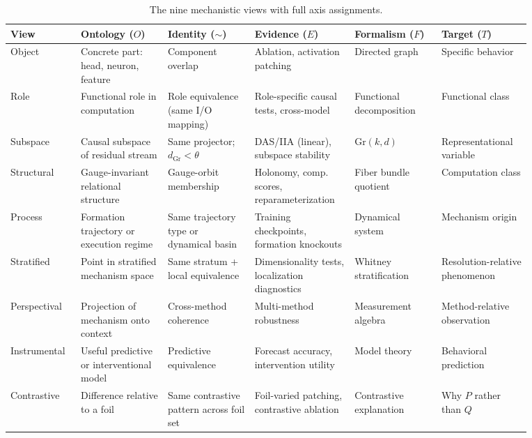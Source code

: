 \documentclass{article}
\newcommand{\Gr}{\mathrm{Gr}}
\begin{document}
\begin{table}[H]
\centering
\small
\setlength{\tabcolsep}{4pt}
\begin{tabular}{p{0.10\linewidth}p{0.15\linewidth}p{0.15\linewidth}p{0.17\linewidth}p{0.15\linewidth}p{0.15\linewidth}}
\toprule
\textbf{View} & \textbf{Ontology ($O$)} & \textbf{Identity ($\sim$)}
  & \textbf{Evidence ($E$)} & \textbf{Formalism ($F$)} & \textbf{Target ($T$)} \\
\midrule
Object
  & Concrete part: head, neuron, feature
  & Component overlap
  & Ablation, activation patching
  & Directed graph
  & Specific behavior \\[3pt]
Role
  & Functional role in computation
  & Role equivalence (same I/O mapping)
  & Role-specific causal tests, cross-model
  & Functional decomposition
  & Functional class \\[3pt]
Subspace
  & Causal subspace of residual stream
  & Same projector; $d_{\Gr} < \theta$
  & DAS/IIA (linear), subspace stability
  & $\Gr(k,d)$
  & Representational variable \\[3pt]
Structural
  & Gauge-invariant relational structure
  & Gauge-orbit membership
  & Holonomy, comp. scores, reparameterization
  & Fiber bundle quotient
  & Computation class \\[3pt]
Process
  & Formation trajectory or execution regime
  & Same trajectory type or dynamical basin
  & Training checkpoints, formation knockouts
  & Dynamical system
  & Mechanism origin \\[3pt]
Stratified
  & Point in stratified mechanism space
  & Same stratum + local equivalence
  & Dimensionality tests, localization diagnostics
  & Whitney stratification
  & Resolution-relative phenomenon \\[3pt]
Perspectival
  & Projection of mechanism onto context
  & Cross-method coherence
  & Multi-method robustness
  & Measurement algebra
  & Method-relative observation \\[3pt]
Instrumental
  & Useful predictive or interventional model
  & Predictive equivalence
  & Forecast accuracy, intervention utility
  & Model theory
  & Behavioral prediction \\[3pt]
Contrastive
  & Difference relative to a foil
  & Same contrastive pattern across foil set
  & Foil-varied patching, contrastive ablation
  & Contrastive explanation
  & Why $P$ rather than $Q$ \\
\bottomrule
\end{tabular}
\caption{The nine mechanistic views with full axis assignments.}
\label{tab:atlas}
\end{table}
\end{document}
